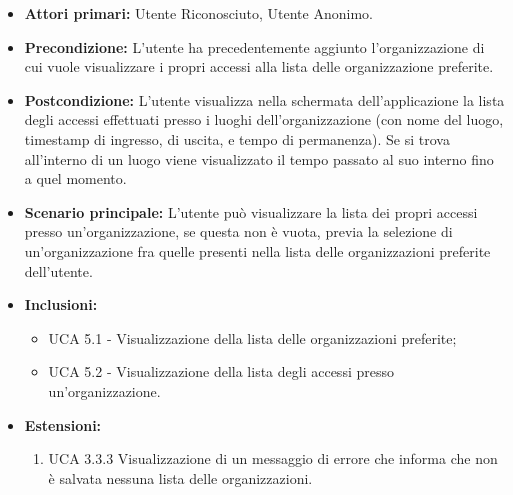 \begin{itemize}
    \item \textbf{Attori primari:} Utente Riconosciuto, Utente Anonimo.
    \item \textbf{Precondizione:} L’utente ha precedentemente aggiunto l’organizzazione di cui vuole visualizzare i propri accessi alla lista delle organizzazione preferite.
    \item \textbf{Postcondizione:} L’utente visualizza nella schermata dell’applicazione la lista degli accessi effettuati presso i luoghi dell’organizzazione (con nome del luogo, timestamp di ingresso, di uscita, e tempo di permanenza).
    Se si trova all'interno di un luogo viene visualizzato il tempo passato al suo interno fino a quel momento.
    \item \textbf{Scenario principale:} L'utente può visualizzare la lista dei propri accessi presso un'organizzazione, se questa non è vuota, previa la selezione di un'organizzazione fra quelle presenti nella lista delle organizzazioni preferite dell'utente.
    \item \textbf{Inclusioni:}
    \begin{itemize}
        \item UCA 5.1 - Visualizzazione della lista delle organizzazioni preferite;
        \item UCA 5.2 - Visualizzazione della lista degli accessi presso un'organizzazione.
    \end{itemize}
    \item \textbf{Estensioni:}
    \begin{enumerate}
        \item UCA 3.3.3 Visualizzazione di un messaggio di errore che informa che non è salvata nessuna lista delle organizzazioni.	
    \end{enumerate}	
\end{itemize}


